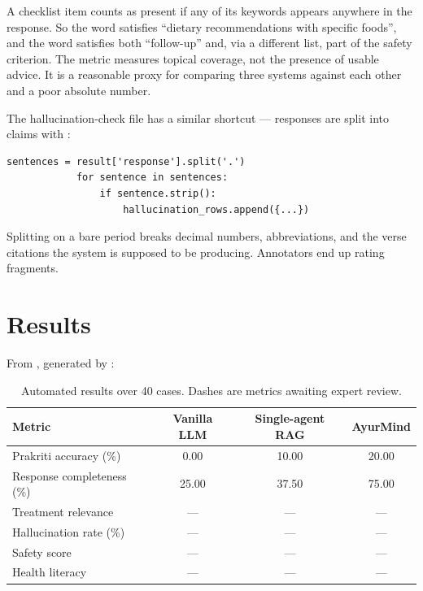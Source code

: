 A checklist item counts as present if any of its keywords appears anywhere in the response. So the word  satisfies ``dietary recommendations with specific foods'', and the word  satisfies both ``follow-up'' and, via a different list, part of the safety criterion. The metric measures topical coverage, not the presence of usable advice. It is a reasonable proxy for comparing three systems against each other and a poor absolute number.

The hallucination-check file has a similar shortcut --- responses are split into claims with :

\begin{lstlisting}[style=py,firstnumber=92]
            sentences = result['response'].split('.')
            for sentence in sentences:
                if sentence.strip():
                    hallucination_rows.append({...})
\end{lstlisting}

Splitting on a bare period breaks decimal numbers, abbreviations, and the verse citations the system is supposed to be producing. Annotators end up rating fragments.

\section{Results}

From , generated by :

\begin{table}[H]
\centering
\small
\begin{tabular}{@{}l c c c@{}}
\toprule
\textbf{Metric} & \textbf{Vanilla LLM} & \textbf{Single-agent RAG} & \textbf{AyurMind} \\
\midrule
Prakriti accuracy (\%)     & 0.00  & 10.00 & 20.00 \\
Response completeness (\%) & 25.00 & 37.50 & 75.00 \\
Treatment relevance        & ---   & ---   & ---   \\
Hallucination rate (\%)    & ---   & ---   & ---   \\
Safety score               & ---   & ---   & ---   \\
Health literacy            & ---   & ---   & ---   \\
\bottomrule
\end{tabular}
\caption{Automated results over 40 cases. Dashes are metrics awaiting expert review.}
\end{table}

